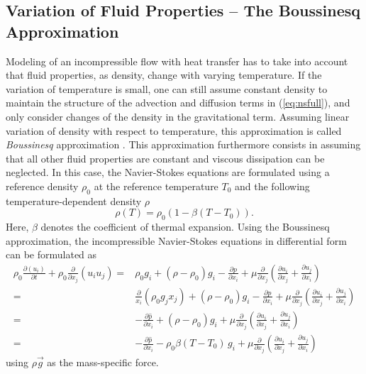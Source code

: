 \subsection{Variation of Fluid Properties -- The Boussinesq Approximation}
\label{sec:boussinesq}

Modeling of an incompressible flow with heat transfer has to take into account that fluid properties, as density, change with varying temperature. If the variation of temperature is small, one can still assume constant density to maintain the structure of the advection and diffusion terms in (\ref{eq:nsfull}), and only consider changes of the density in the gravitational term. Assuming linear variation of density with respect to temperature, this approximation is called \emph{Boussinesq} approximation \cite{gray76}. This approximation furthermore consists in assuming that all other fluid properties are constant and viscous dissipation can be neglected. In this case, the Navier-Stokes equations are formulated using a reference density \(\rho_0\) at the reference temperature \(T_0\) and the following temperature-dependent density \(\rho\)
\begin{displaymath}
  \rho \left( T \right) = \rho_0 \left( 1 - \beta \left( T - T_0 \right) \right).
\end{displaymath}
Here, \(\beta\) denotes the coefficient of thermal expansion. Using the Boussinesq approximation, the incompressible Navier-Stokes equations in differential form can be formulated as
\begin{align*}
  \rho_0 \frac{\partial \left( u_i \right)}{\partial t} 
  + \rho_0 \frac{\partial}{\partial x_j} \left( u_i  u_j \right) 
  =& \rho_0 g_i + \left(\rho - \rho_0 \right) g_i
  - \frac{\partial p}{\partial x_i}
  +  \mu \frac{\partial}{\partial x_j} \left( \frac{\partial u_i}{\partial x_j} 
  + \frac{\partial u_j}{\partial x_i} \right)  \\[0.5em]
  =& \frac{\partial}{x_i}\left(\rho_0 g_j x_j \right) 
  + \left(\rho - \rho_0 \right) g_i
  - \frac{\partial p}{\partial x_i}
  +  \mu \frac{\partial}{\partial x_j} \left( \frac{\partial u_i}{\partial x_j} 
  + \frac{\partial u_j}{\partial x_i} \right)  \\[0.5em]
  =& - \frac{\partial \hat{p}}{\partial x_i} 
  + \left(\rho - \rho_0 \right) g_i
  +  \mu \frac{\partial}{\partial x_j} \left( \frac{\partial u_i}{\partial x_j} 
  + \frac{\partial u_j}{\partial x_i} \right)  \\[0.5em]
  =& - \frac{\partial \hat{p}}{\partial x_i} 
  - \rho_0 \beta \left( T - T_0 \right) \, g_i
  +  \mu \frac{\partial}{\partial x_j} \left( \frac{\partial u_i}{\partial x_j} 
                                       + \frac{\partial u_j}{\partial x_i} \right) 
\end{align*}
using \(\rho \vec{g}\) as the mass-specific force. 

